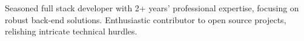 

\begin{cvparagraph}

Seasoned full stack developer with 2+ years' professional expertise, focusing on robust back-end solutions. Enthusiastic contributor to open source projects, relishing intricate technical hurdles.
\end{cvparagraph}
